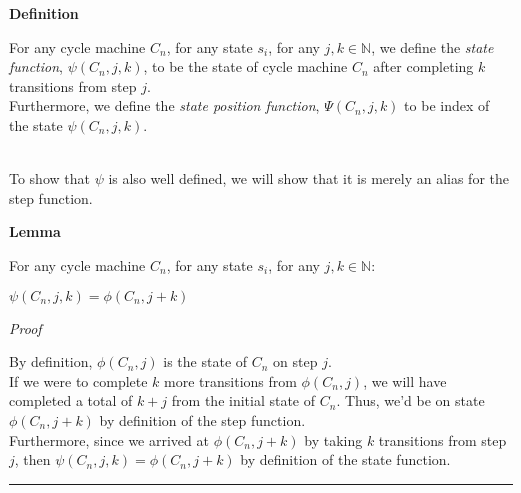 \documentclass[a4paper,12pt]{article}
\begin{document}
\label{definition:state_function}
\hypertarget{definition:state_function}{}
\begin{tcolorbox}
\textbf{Definition}

\noindent For any cycle machine $C_n$, for any state $s_i$, for any $j, k \in \mathbb{N}$, we define the \textit{state function}, $\psi(C_n, j, k)$, to be the state of cycle machine $C_n$ after completing $k$ transitions from step $j$.\\

\noindent Furthermore, we define the \textit{state position function}, $\Psi(C_n, j, k)$ to be index of the state $\psi(C_n, j, k)$.
\end{tcolorbox}




\noindent \\ To show that $\psi$ is also well defined, we will show that it is merely an alias for the step function.\\





\label{lemma:psi_well_defined}
\hypertarget{lemma:psi_well_defined}{}
\begin{tcolorbox}
\textbf{Lemma}

\noindent For any cycle machine $C_n$, for any state $s_i$, for any $j, k \in \mathbb{N}$:

\begin{center}
$\psi(C_n, j, k) = \phi(C_n, j + k)$
\end{center}

\end{tcolorbox}


\noindent
\textit{Proof}

\noindent By definition, $\phi(C_n, j)$ is the state of $C_n$ on step $j$.\\

\noindent If we were to complete $k$ more transitions from $\phi(C_n, j)$, we will have completed a total of $k + j$ from the initial state of $C_n$. Thus, we'd be on state $\phi(C_n, j + k)$ by definition of the step function.\\

\noindent Furthermore, since we arrived at $\phi(C_n, j + k)$ by taking $k$ transitions from step $j$, then $\psi(C_n, j, k) = \phi(C_n, j + k)$ by definition of the state function.

\begin{center}
\noindent\rule{8cm}{0.4pt}
\end{center}
\end{document}
